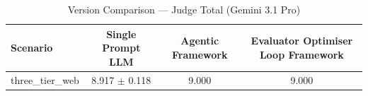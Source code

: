 \begin{table}[htbp]
\centering
\caption{Version Comparison — Judge Total (Gemini 3.1 Pro)}
\label{tab:version_judge_total_gemini}
\begin{tabular}{lccc}
\toprule
Scenario & Single Prompt LLM & Agentic Framework & Evaluator Optimiser Loop Framework \\
\midrule
three\_tier\_web & 8.917 $\pm$ 0.118 & 9.000 & 9.000 \\
\bottomrule
\end{tabular}
\end{table}